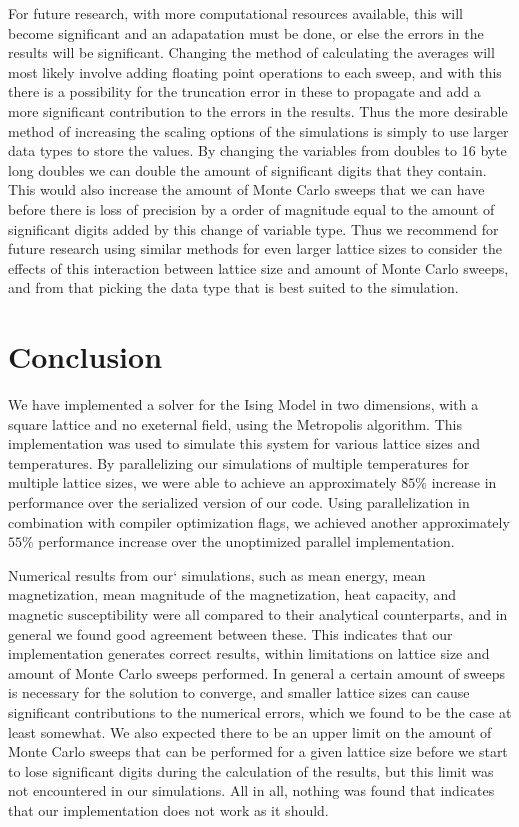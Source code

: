 \documentclass[reprint,english,notitlepage]{revtex4-1}  %
\begin{document}
For future research, with more computational resources available, this will become significant and an adapatation must be done, or else the errors in the results will be significant. Changing the method of calculating the averages will most likely involve adding floating point operations to each sweep, and with this there is a possibility for the truncation error in these to propagate and add a more significant contribution to the errors in the results. Thus the more desirable method of increasing the scaling options of the simulations is simply to use larger data types to store the values. By changing the variables from doubles to 16 byte long doubles we can double the amount of significant digits that they contain. This would also increase the amount of Monte Carlo sweeps that we can have before there is loss of precision by a order of magnitude equal to the amount of significant digits added by this change of variable type. Thus we recommend for future research using similar methods for even larger lattice sizes to consider the effects of this interaction between lattice size and amount of Monte Carlo sweeps, and from that picking the data type that is best suited to the simulation. 

\clearpage



\section{Conclusion} \label{sec:VI}

We have implemented a solver for the Ising Model in two dimensions, with a square lattice and no exeternal field, using the Metropolis algorithm. This implementation was used to simulate this system for various lattice sizes and temperatures. By parallelizing our simulations of multiple temperatures for multiple lattice sizes, we were able to achieve an approximately \(85\%\) increase in performance over the serialized version of our code. Using parallelization in combination with compiler optimization flags, we achieved another approximately \(55\%\) performance increase over the unoptimized parallel implementation.

Numerical results from our` simulations, such as mean energy, mean magnetization, mean magnitude of the magnetization, heat capacity, and magnetic susceptibility were all compared to their analytical counterparts, and in general we found good agreement between these. This indicates that our implementation generates correct results, within limitations on lattice size and amount of Monte Carlo sweeps performed. In general a certain amount of sweeps is necessary for the solution to converge, and smaller lattice sizes can cause significant contributions to the numerical errors, which we found to be the case at least somewhat. We also expected there to be an upper limit on the amount of Monte Carlo sweeps that can be performed for a given lattice size before we start to lose significant digits during the calculation of the results, but this limit was not encountered in our simulations. All in all, nothing was found that indicates that our implementation does not work as it should.
\end{document}
